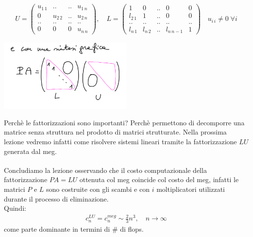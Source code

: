 \[ \begin{split}
	U=
		\begin{pmatrix}
		u_{1\,1} & .. & .. & u_{1\,n} \\
		0 & u_{2\,2} & .. & u_{2\,n} \\
		.. & .. & .. & .. \\
		0 & 0 & 0 & u_{n\,n}
		\end{pmatrix}
	, \quad L=
		\begin{pmatrix}
		1 & 0 & .. & 0 & 0 \\
		l_{2\,1} & 1 & .. & 0 & 0 \\
		.. & .. & .. & .. & .. \\
		l_{n\,1} & l_{n\,2} & .. & l_{n\,n-1} & 1 
		\end{pmatrix}
	\quad u_{i\,i} \neq 0 \; \forall i
\end{split} \]
\begin{center}
\includegraphics[width = 0.5\textwidth]{foto/pag_19}
\end{center}
Perchè le fattorizzazioni sono importanti? Perchè permettono di decomporre una matrice senza struttura nel prodotto di matrici strutturate. Nella prossima lezione vedremo infatti come risolvere sistemi lineari tramite la fattorizzazione $LU$ generata dal meg.\\\\
Concludiamo la lezione osservando che il costo computazionale della fattorizzazione $PA=LU$ ottenuta col meg coincide col costo del meg, infatti le matrici $P$ e $L$ sono costruite con gli scambi e con $i$ moltiplicatori utilizzati durante il processo di eliminazione.\\
Quindi:
\[ \begin{split}
	c_n^{LU}=c_n^{meg}\sim\frac{2}{3}n^3, \quad n\to \infty
\end{split} \]
come parte dominante in termini di \# di flops.
\newpage